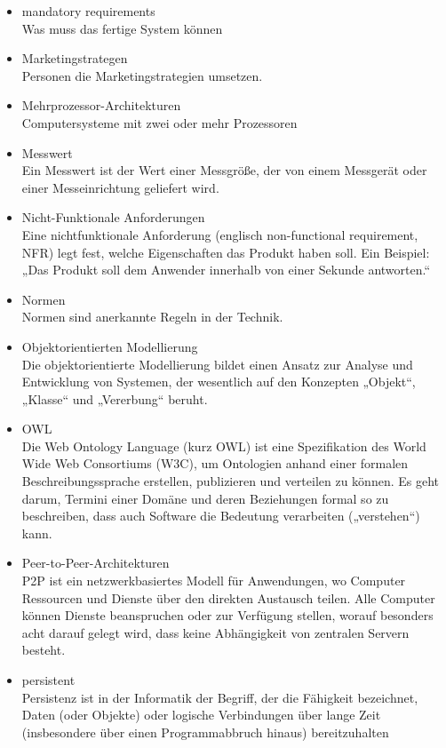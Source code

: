\begin{itemize}
\item 	mandatory requirements\\
Was muss das fertige System können
\item 	Marketingstrategen
\\Personen die Marketingstrategien umsetzen.
\item 	Mehrprozessor-Architekturen\\
Computersysteme mit zwei oder mehr Prozessoren
\item 	Messwert\\Ein Messwert ist der Wert einer Messgröße, der von einem Messgerät oder einer Messeinrichtung geliefert wird.
\item 	Nicht-Funktionale Anforderungen\\
Eine nichtfunktionale Anforderung (englisch non-functional requirement, NFR) legt fest, welche Eigenschaften das Produkt haben soll. Ein Beispiel:
\\
„Das Produkt soll dem Anwender innerhalb von einer Sekunde antworten.“
\item 	Normen\\Normen sind anerkannte Regeln in der Technik. 
\item 	Objektorientierten Modellierung\\Die objektorientierte Modellierung bildet einen Ansatz zur Analyse und Entwicklung von Systemen, der wesentlich auf den Konzepten „Objekt“, „Klasse“ und „Vererbung“ beruht.
\item 	OWL\\
Die Web Ontology Language (kurz OWL) ist eine Spezifikation des World Wide Web Consortiums (W3C), um Ontologien anhand einer formalen Beschreibungssprache erstellen, publizieren und verteilen zu können. Es geht darum, Termini einer Domäne und deren Beziehungen formal so zu beschreiben, dass auch Software die Bedeutung verarbeiten („verstehen“) kann.
\item 	Peer-to-Peer-Architekturen\\
P2P ist ein netzwerkbasiertes Modell für Anwendungen, wo Computer Ressourcen und
Dienste über den direkten Austausch teilen. Alle Computer können Dienste beanspruchen
oder zur Verfügung stellen, worauf besonders acht darauf gelegt wird, dass keine
Abhängigkeit von zentralen Servern besteht.
\item 	persistent\\Persistenz ist in der Informatik der Begriff, der die Fähigkeit bezeichnet, Daten (oder Objekte) oder logische Verbindungen über lange Zeit (insbesondere über einen Programmabbruch hinaus) bereitzuhalten

\end{itemize}
